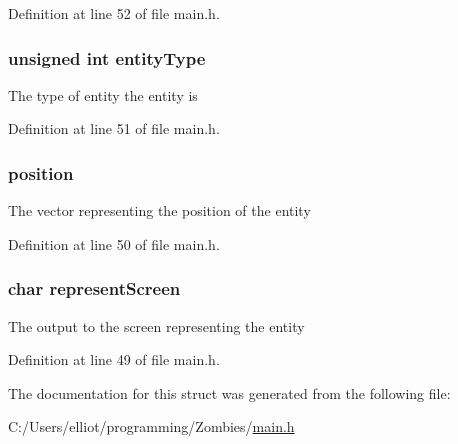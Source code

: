 Definition at line 52 of file main.\+h.

\hypertarget{structentity_a4bbf274a430246911e0893de70e0ecc2}{}
\subsubsection[{entity\+Type}]{\setlength{\rightskip}{0pt plus 5cm}unsigned int entity\+Type}\label{structentity_a4bbf274a430246911e0893de70e0ecc2}
The type of entity the entity is 

Definition at line 51 of file main.\+h.

\hypertarget{structentity_ab0d5c56202dcdb82d09d9dfd10f01aa7}{}
\subsubsection[{position}]{ position}\label{structentity_ab0d5c56202dcdb82d09d9dfd10f01aa7}
The vector representing the position of the entity 

Definition at line 50 of file main.\+h.

\hypertarget{structentity_abdf49eaf9c20a9d8c4caf4cb354dc1aa}{}
\subsubsection[{represent\+Screen}]{\setlength{\rightskip}{0pt plus 5cm}char represent\+Screen}\label{structentity_abdf49eaf9c20a9d8c4caf4cb354dc1aa}
The output to the screen representing the entity 

Definition at line 49 of file main.\+h.



The documentation for this struct was generated from the following file\+:\begin{DoxyCompactItemize}
\item 
C\+:/\+Users/elliot/programming/\+Zombies/\hyperlink{main_8h}{main.\+h}\end{DoxyCompactItemize}
